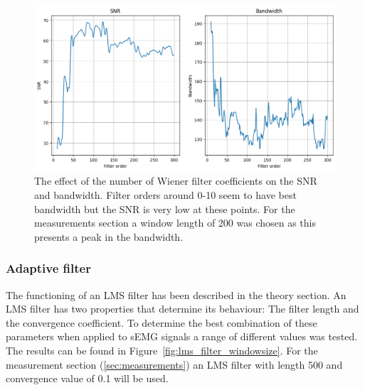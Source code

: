 \begin{figure}[h!t]
	\begin{center}
		\includegraphics[width=1.0\columnwidth]{images/wiener_filter_length.png}
	\end{center}
	\caption{The effect of the number of Wiener filter coefficients on the SNR and bandwidth. Filter orders around 0-10 seem to have best bandwidth but the SNR is very low at these points. For the measurements section a window length of 200 was chosen as this presents a peak in the bandwidth. }
	\label{fig:wiener_filter_length}
\end{figure}

\subsubsection{Adaptive filter}
The functioning of an LMS filter has been described in the theory section. An LMS filter has two properties that determine its behaviour: The filter length and the convergence coefficient. To determine the best combination of these parameters when applied to sEMG signals a range of different values was tested. The results can be found in Figure~\ref{fig:lms_filter_windowsize}. For the measurement section (\ref{sec:measurements}) an LMS filter with length 500 and convergence value of 0.1 will be used.

